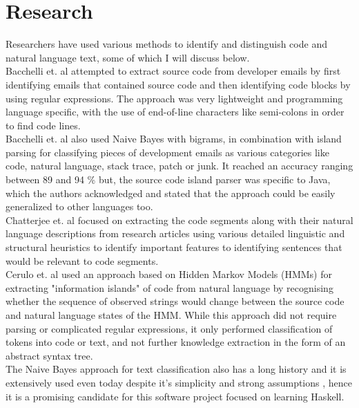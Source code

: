 \documentclass[12pt]{scrreprt}
\begin{document}


\section{Research}


Researchers have used various methods to identify and distinguish code and natural language text, some of which I will discuss below. \\ Bacchelli et. al \cite{bachemail} attempted to extract source code from developer emails by first identifying emails that contained source code and then identifying code blocks by using regular expressions. The approach was very lightweight and programming language specific, with the use of end-of-line characters like semi-colons in order to find code lines. \\ Bacchelli et. al \cite{bachcontent} also used Naive Bayes with bigrams, in combination with island parsing for classifying pieces of development emails as various categories like code, natural language, stack trace, patch or junk. It reached an accuracy ranging between 89 and 94 \% but, the source code island parser was specific to Java, which the authors acknowledged and stated that the approach could be easily generalized to other languages too. \\ Chatterjee et. al \cite{chattter} focused on extracting the code segments along with their natural language descriptions from research articles using various detailed linguistic and structural heuristics to identify important features to identifying sentences that would be relevant to code segments. \\ Cerulo et. al \cite{cerulohmm} used an approach based on Hidden Markov Models (HMMs) for extracting "information islands" of code from natural language by recognising whether the sequence of observed strings would change between the source code and natural language states of the HMM. While this approach did not require parsing or complicated regular expressions, it only performed classification of tokens into code or text, and not further knowledge extraction in the form of an abstract syntax tree.\\ The Naive Bayes approach for text classification also has a long history and it is extensively used even today despite it's simplicity and strong assumptions \cite{juraf}, hence it is a promising candidate for this software project focused on learning Haskell.
\end{document}
